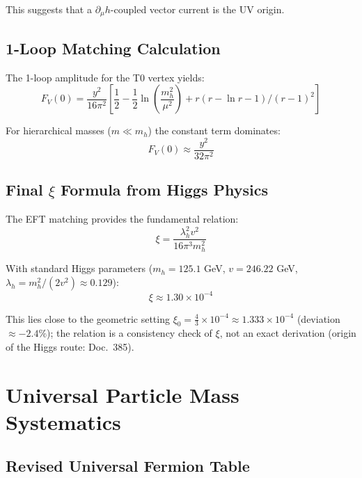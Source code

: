 	This suggests that a $\partial_\mu h$-coupled vector current is the UV origin.
	
	\subsection{1-Loop Matching Calculation}
	\label{subsec:one_loop_matching}
	
	The 1-loop amplitude for the T0 vertex yields:
	\begin{equation}
		F_V(0) = \frac{y^2}{16\pi^2}\left[\frac{1}{2} - \frac{1}{2}\ln\left(\frac{m_h^2}{\mu^2}\right) + r(r-\ln r-1)/(r-1)^2\right]
	\end{equation}
	
	For hierarchical masses ($m \ll m_h$) the constant term dominates:
	\begin{equation}
		F_V(0) \approx \frac{y^2}{32\pi^2}
	\end{equation}
	
	\subsection{Final $\xi$ Formula from Higgs Physics}
	\label{subsec:final_xi_formula}
	
	The EFT matching provides the fundamental relation:
	\begin{equation}
		\boxed{\xi = \frac{\lambda_h^2 v^2}{16\pi^3 m_h^2}}
	\end{equation}
	
	With standard Higgs parameters ($m_h = 125.1$ GeV, $v = 246.22$ GeV, $\lambda_h = m_h^2/(2v^2) \approx 0.129$):
	\begin{equation}
		\xi \approx 1.30 \times 10^{-4}
	\end{equation}
	
	This lies close to the geometric setting $\xi_0 = \frac{4}{3} \times 10^{-4} \approx 1.333 \times 10^{-4}$ (deviation $\approx -2.4\%$); the relation is a consistency check of $\xi$, not an exact derivation (origin of the Higgs route: Doc.~385).
	
	\section{Universal Particle Mass Systematics}
	\label{sec:universal_masses}
	
	\subsection{Revised Universal Fermion Table}
	\label{subsec:universal_table}
	
